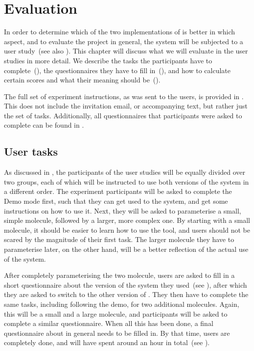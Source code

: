 \chapter{Evaluation}

In order to determine which of the two implementations of \oframp{} is better in which aspect, and to evaluate the project in general, the system will be subjected to a user study~(see also ). This chapter will discuss what we will evaluate in the user studies in more detail. We describe the tasks the participants have to complete~(), the questionnaires they have to fill in~(), and how to calculate certain scores and what their meaning should be~().

The full set of experiment instructions, as was sent to the users, is provided in . This does not include the invitation email, or accompanying text, but rather just the set of tasks. Additionally, all questionnaires that participants were asked to complete can be found in .



\section{User tasks}
As discussed in , the participants of the user studies will be equally divided over two groups, each of which will be instructed to use both versions of the system in a different order. The experiment participants will be asked to complete the Demo mode first, such that they can get used to the system, and get some instructions on how to use it. Next, they will be asked to parameterise a small, simple molecule, followed by a larger, more complex one. By starting with a small molecule, it should be easier to learn how to use the tool, and users should not be scared by the magnitude of their first task. The larger molecule they have to parameterise later, on the other hand, will be a better reflection of the actual use of the system.

After completely parameterising the two molecule, users are asked to fill in a short questionnaire about the version of the system they used~(see ), after which they are asked to switch to the other version of \oframp. They then have to complete the same tasks, including following the demo, for two additional molecules. Again, this will be a small and a large molecule, and participants will be asked to complete a similar questionnaire. When all this has been done, a final questionnaire about \oframp{} in general needs to be filled in. By that time, users are completely done, and will have spent around an hour in total~(see ).


